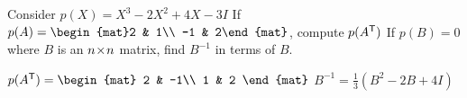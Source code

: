 
\begin{Exercise}[
name={},
title={}, 
difficulty=0,
origin={\cite{OV}}]
Consider $p(X)=X^3-2X^2+4X-3I$
\Question If $p(A)=\begin{mat}2 & 1\\ -1 & 2\end{mat}$, compute $p({{A}^{\mathsf{T}}})$
\Question If $p(B)=0$ where $B$ is an $n \! \times \! n$ matrix, find $B^{-1}$ in terms of $B$. 
\end{Exercise}

\begin{Answer}
\Question
$
p(\trans{A})=
\begin{mat}
2 & -1\\
1 & 2
\end{mat}
$
\Question $B^{-1}=\frac13(B^2-2B+4I)$

\end{Answer}
